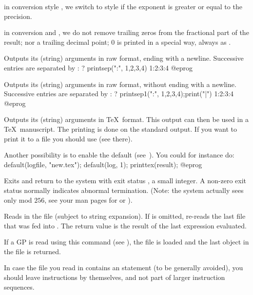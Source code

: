 {\item in conversion style , we switch to style  if the
exponent is greater or equal to the precision.

\item in conversion  and , we do not remove trailing zeros
 from the fractional part of the result; nor a trailing decimal point;
 0 is printed in a special way, always as .

\label{se:printsep}
Outputs its (string) arguments in raw format, ending with a newline.
Successive entries are separated by :
\bprog
? printsep(":", 1,2,3,4)
1:2:3:4
@eprog

\label{se:printsep1}
Outputs its (string) arguments in raw format, without ending with a
newline.  Successive entries are separated by :
\bprog
? printsep1(":", 1,2,3,4);print("|")
1:2:3:4
@eprog

\label{se:printtex}
Outputs its (string) arguments in \TeX\ format. This output can then be
used in a \TeX\ manuscript.
The printing is done on the standard output. If you want to print it to a
file you should use  (see there).

Another possibility is to enable the  default
(see~).
You could for instance do:
%
\bprog
default(logfile, "new.tex");
default(log, 1);
printtex(result);
@eprog

\label{se:quit}
Exits  and return to the system with exit status
, a small integer. A non-zero exit status normally indicates
abnormal termination. (Note: the system actually sees only
 mod $256$, see your man pages for  or ).

\label{se:read}
Reads in the file
 (subject to string expansion). If  is
omitted, re-reads the last file that was fed into . The return
value is the result of the last expression evaluated.

If a GP  is read using this command (see
), the file is loaded and the last object in the file
is returned.

In case the file you read in contains an  statement (to be
generally avoided), you should leave  instructions by themselves,
and not part of larger instruction sequences.

}
